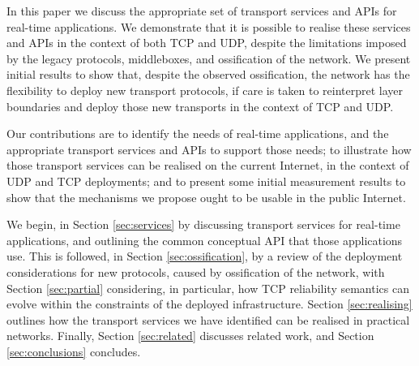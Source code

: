 \documentclass[10pt]{sig-alternate-05-2015}
\begin{document}

In this paper we discuss the appropriate set of transport services and APIs
for real-time applications.
We demonstrate that it is possible to realise these services and APIs
in the context of both TCP and UDP, despite the limitations imposed by the
legacy protocols, middleboxes, and ossification of the network.
We present initial results to show that, despite the observed ossification,
the network has the flexibility to deploy new transport protocols, if care
is taken to reinterpret layer boundaries and deploy those new transports in
the context of TCP and UDP.


Our contributions are to identify the needs of real-time applications, and
the appropriate transport services and APIs to support those needs;
to illustrate how those transport services can be realised on the current
Internet, in the context of UDP and TCP deployments; and
to present some initial measurement results to show that the mechanisms we
propose ought to be usable in the public Internet.


We begin, in Section \ref{sec:services} by discussing transport services
for real-time applications, and outlining the common conceptual API that
those applications use.
This is followed, in Section \ref{sec:ossification}, by a review of the
deployment considerations for new protocols, caused by ossification of
the network, with Section \ref{sec:partial} considering, in particular, how
TCP reliability semantics can evolve within the constraints of the deployed
infrastructure.
Section \ref{sec:realising} outlines how the transport services we have
identified can be realised in practical networks.
Finally, Section \ref{sec:related} discusses related work, and Section
\ref{sec:conclusions} concludes.
\end{document}
